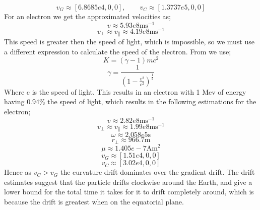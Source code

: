 \documentclass[14paper,11pt,hidelinks]{article}
\begin{document}
\begin{equation}
v_G\approx[6.8685e4,0,0],\qquad v_C\approx [1.3737e5,0,0]
\end{equation}
\newline
\newline
For an electron we get the approximated velocities as;
\begin{equation}
v\approx5.93e8 \mbox{ms}^{-1}
\end{equation}
\begin{equation}
v_\bot\approx v_\parallel\approx 4.19e8 \mbox{ms}^{-1 }
\end{equation}
This speed is greater then the speed of light, which is impossible, so we must use a different expression to calculate the speed of the electron. From \citet{Taylor_Spacetime_1992} we use;
\begin{equation}
K=(\gamma-1)mc^2
\end{equation}
\begin{equation}
\gamma=\frac{1}{(1-\frac{v^2}{c^2})^\frac{1}{2}}
\end{equation}
Where c is the speed of light. This results in an electron with 1 Mev of energy having \begin{math} 0.94\% \end{math} the speed of light, which results in the following estimations for the electron;
\begin{equation}
v\approx2.82e8 \mbox{ms}^{-1}
\end{equation}
\begin{equation}
v_\bot\approx v_\parallel\approx 1.99e8 \mbox{ms}^{-1} 
\end{equation}
\begin{equation}
\omega\approx 2.058e5 \mbox{s}
\end{equation}
\begin{equation}
r_\bot\approx 966.7 \mbox{m}
\end{equation}
\begin{equation}
\mu\approx1.405e-7 \mbox{Am}^2
\end{equation}
\begin{equation}
v_G\approx[1.51e4, 0, 0]
\end{equation}
\begin{equation}
v_C\approx[3.02e4,0,0] 
\end{equation}
Hence as \begin{math} v_C>v_G\end{math} the curvature drift dominates over the gradient drift. The drift estimates suggest that the particle drifts clockwise around the Earth, and give a lower bound for the total time it takes for it to drift completely around, which is because the drift is greatest when on the equatorial plane.
\end{document}
